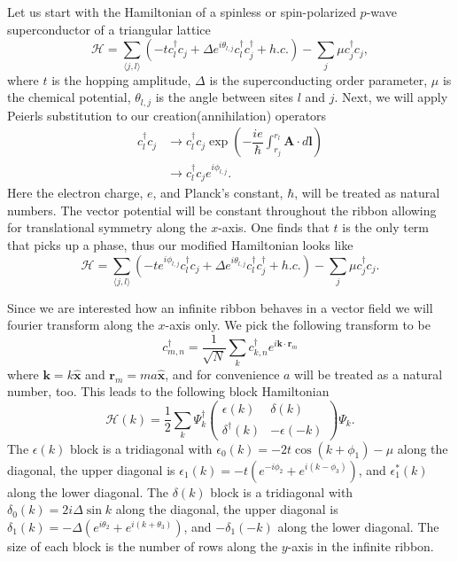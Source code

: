 \documentclass[aps,prb,showpacs,amsmath,amssymb,superscriptaddress]{revtex4-2}
\let\oldhat\hat
\renewcommand{\hat}[1]{\oldhat{\mathbf{#1}}}
\renewcommand{\vec}[1]{\mathbf{#1}}
\newcommand{\ham}{\mathcal{H}}
\newcommand{\cc}{c^{\dagger}}
\newcommand{\de}{\Delta}
\begin{document}
Let us start with the Hamiltonian of a spinless or spin-polarized $p$-wave superconductor of a triangular lattice
\begin{equation}
  \ham = \sum_{\langle j, l \rangle} (-t\cc_{l} c_j + \de e^{i\theta_{l,j}} \cc_{l}\cc_j + h.c.) - \sum_{j} \mu \cc_j c_j,
\end{equation}
where $t$ is the hopping amplitude, $\de$ is the superconducting order parameter, $\mu$ is the chemical potential, $\theta_{l,j}$ is the angle between sites $l$ and $j$.
Next, we will apply Peierls substitution to our creation(annihilation) operators
\begin{align}
  \cc_{l} c_j &\rightarrow \cc_{l} c_j \exp \left(-\dfrac{i e}{\hbar} \int_{r_j}^{r_{l}} \vec{A} \cdot d\vec{l} \right) \\ \nonumber
  &\rightarrow \cc_{l} c_j e^{i \phi_{l,j}}.
\end{align}
Here the electron charge, $e$, and Planck's constant, $\hbar$, will be treated as natural numbers.
The vector potential will be constant throughout the ribbon allowing for translational symmetry along the $x$-axis.
One finds that $t$ is the only term that picks up a phase, thus our modified Hamiltonian looks like
\begin{equation} \label{eq: Peierls Hamiltonian}
  \ham = \sum_{\langle j,l \rangle} (-t e^{i\phi_{l,j}} \cc_{l} c_j + \de e^{i\theta_{l,j}} \cc_{l}\cc_j + h.c.) - \sum_j \mu \cc_j c_j.
\end{equation}

Since we are interested how an infinite ribbon behaves in a vector field we will fourier transform along the $x$-axis only.
We pick the following transform to be
\begin{equation}
  \cc_{m,n} = \dfrac{1}{\sqrt{N}} \sum_{k} \cc_{k,n} e^{i \vec{k}\cdot\vec{r}_m}
\end{equation}
where $\vec{k}=k\hat{x}$ and $\vec{r}_m = ma\hat{x}$, and for convenience $a$ will be treated as a natural number, too.
This leads to the following block Hamiltonian
\begin{equation}
  \ham(k) = \dfrac{1}{2} \sum_k \Psi_k^\dagger \left(
    \begin{matrix}
      \epsilon(k) & \delta(k) \\
      \delta^\dagger(k) & -\epsilon(-k)
    \end{matrix} \right)
    \Psi_k.
\end{equation}
The $\epsilon(k)$ block is a tridiagonal with $\epsilon_0(k) = -2t\cos(k+\phi_1) - \mu$ along the diagonal, the upper diagonal is  $\epsilon_1(k) = -t(e^{-i\phi_2}+e^{i(k-\phi_3)})$, and $\epsilon_1^*(k)$ along the lower diagonal.
The $\delta(k)$ block is a tridiagonal with $\delta_0(k) = 2i\de \sin k $ along the diagonal, the upper diagonal is  $\delta_1(k) = -\de (e^{i\theta_2}+e^{i(k+\theta_3)})$, and $-\delta_1(-k)$ along the lower diagonal.
The size of each block is the number of rows along the $y$-axis in the infinite ribbon.
\end{document}
